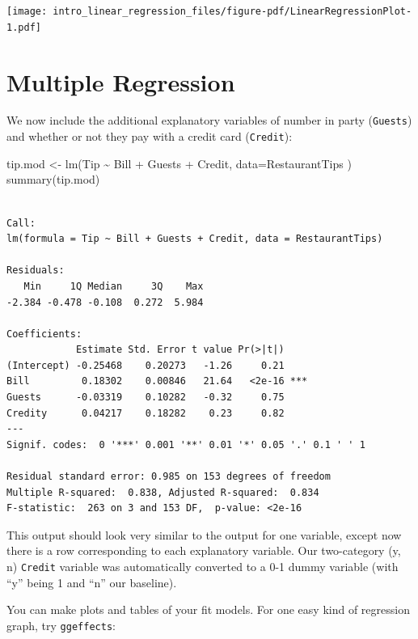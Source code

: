 \documentclass[
  letterpaper,
  DIV=11,
  numbers=noendperiod]{scrreprt}
\newenvironment{Shaded}{}{}
\newcommand{\AttributeTok}[1]{\textcolor[rgb]{0.49,0.56,0.16}{#1}}
\newcommand{\FunctionTok}[1]{\textcolor[rgb]{0.02,0.16,0.49}{#1}}
\newcommand{\NormalTok}[1]{#1}
\newcommand{\OtherTok}[1]{\textcolor[rgb]{0.00,0.44,0.13}{#1}}
\newcommand{\SpecialCharTok}[1]{\textcolor[rgb]{0.25,0.44,0.63}{#1}}
\begin{document}
\begin{center}
\texttt{[image: intro\_linear\_regression\_files/figure-pdf/LinearRegressionPlot-1.pdf]}
\end{center}

\section{Multiple Regression}\label{multiple-regression}

We now include the additional explanatory variables of number in party
(\texttt{Guests}) and whether or not they pay with a credit card
(\texttt{Credit}):

\begin{Shaded}
\begin{Highlighting}[]
\NormalTok{tip.mod }\OtherTok{\textless{}{-}} \FunctionTok{lm}\NormalTok{(Tip }\SpecialCharTok{\textasciitilde{}}\NormalTok{ Bill }\SpecialCharTok{+}\NormalTok{ Guests }\SpecialCharTok{+}\NormalTok{ Credit, }\AttributeTok{data=}\NormalTok{RestaurantTips )}
\FunctionTok{summary}\NormalTok{(tip.mod)}
\end{Highlighting}
\end{Shaded}

\begin{verbatim}

Call:
lm(formula = Tip ~ Bill + Guests + Credit, data = RestaurantTips)

Residuals:
   Min     1Q Median     3Q    Max 
-2.384 -0.478 -0.108  0.272  5.984 

Coefficients:
            Estimate Std. Error t value Pr(>|t|)    
(Intercept) -0.25468    0.20273   -1.26     0.21    
Bill         0.18302    0.00846   21.64   <2e-16 ***
Guests      -0.03319    0.10282   -0.32     0.75    
Credity      0.04217    0.18282    0.23     0.82    
---
Signif. codes:  0 '***' 0.001 '**' 0.01 '*' 0.05 '.' 0.1 ' ' 1

Residual standard error: 0.985 on 153 degrees of freedom
Multiple R-squared:  0.838, Adjusted R-squared:  0.834 
F-statistic:  263 on 3 and 153 DF,  p-value: <2e-16
\end{verbatim}

This output should look very similar to the output for one variable,
except now there is a row corresponding to each explanatory variable.
Our two-category (y, n) \texttt{Credit} variable was automatically
converted to a 0-1 dummy variable (with ``y'' being 1 and ``n'' our
baseline).

You can make plots and tables of your fit models. For one easy kind of
regression graph, try \texttt{ggeffects}:
\end{document}
